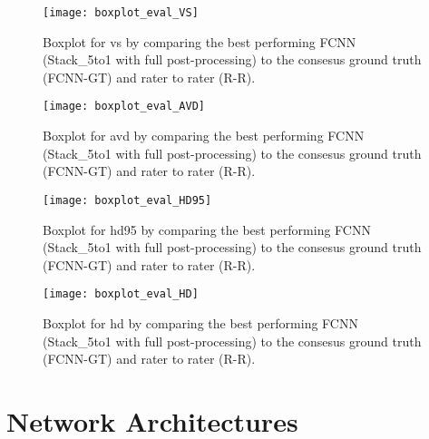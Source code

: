 \begin{figure}[htbp]
	\centering
	\texttt{[image: boxplot\_eval\_VS]}
    \caption[Boxplot for the \acrlong{vs} for the Evaluation]{Boxplot for \acrlong{vs} by comparing the best performing FCNN (Stack\_5to1 with full post-processing) to the consesus ground truth (FCNN-GT) and rater to rater (R-R).}
    \label{fig:results_eval_boxplot_vs}
\end{figure}
\begin{figure}[htbp]
	\centering
	\texttt{[image: boxplot\_eval\_AVD]}
    \caption[Boxplot for the \acrlong{avd} for the Evaluation]{Boxplot for \acrlong{avd} by comparing the best performing FCNN (Stack\_5to1 with full post-processing) to the consesus ground truth (FCNN-GT) and rater to rater (R-R).}
    \label{fig:results_eval_boxplot_avd}
\end{figure}
\begin{figure}[htbp]
	\centering
	\texttt{[image: boxplot\_eval\_HD95]}
    \caption[Boxplot for the \acrlong{hd95} for the Evaluation]{Boxplot for \acrlong{hd95} by comparing the best performing FCNN (Stack\_5to1 with full post-processing) to the consesus ground truth (FCNN-GT) and rater to rater (R-R).}
    \label{fig:results_eval_boxplot_hd95}
\end{figure}
\begin{figure}[htbp]
	\centering
	\texttt{[image: boxplot\_eval\_HD]}
    \caption[Boxplot for the \acrlong{hd} for the Evaluation]{Boxplot for \acrlong{hd} by comparing the best performing FCNN (Stack\_5to1 with full post-processing) to the consesus ground truth (FCNN-GT) and rater to rater (R-R).}
    \label{fig:results_eval_boxplot_hd}
\end{figure}

\chapter{Network Architectures} %

